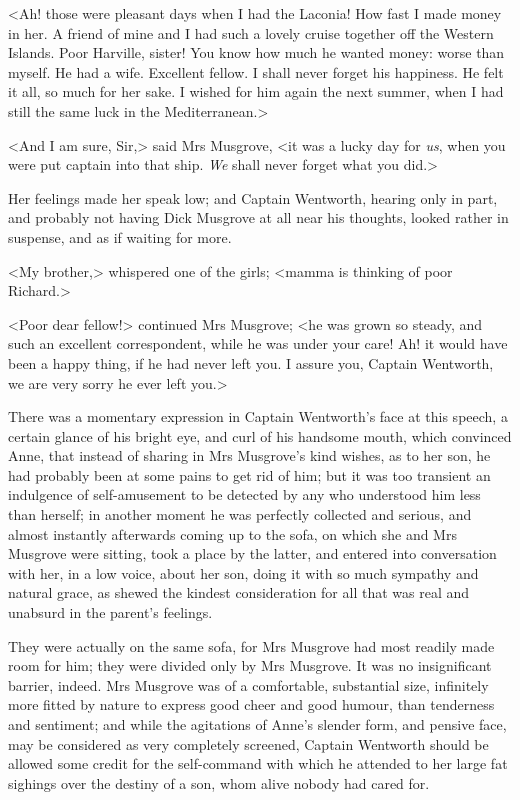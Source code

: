 <Ah! those were pleasant days when I had the Laconia! How fast I made money in her. A friend of mine and I had such a lovely cruise together off the Western Islands. Poor Harville, sister! You know how much he wanted money: worse than myself. He had a wife. Excellent fellow. I shall never forget his happiness. He felt it all, so much for her sake. I wished for him again the next summer, when I had still the same luck in the Mediterranean.>

<And I am sure, Sir,> said Mrs Musgrove, <it was a lucky day for \textit{us}, when you were put captain into that ship. \textit{We} shall never forget what you did.>

Her feelings made her speak low; and Captain Wentworth, hearing only in part, and probably not having Dick Musgrove at all near his thoughts, looked rather in suspense, and as if waiting for more.

<My brother,> whispered one of the girls; <mamma is thinking of poor Richard.>

<Poor dear fellow!> continued Mrs Musgrove; <he was grown so steady, and such an excellent correspondent, while he was under your care! Ah! it would have been a happy thing, if he had never left you. I assure you, Captain Wentworth, we are very sorry he ever left you.>

There was a momentary expression in Captain Wentworth's face at this speech, a certain glance of his bright eye, and curl of his handsome mouth, which convinced Anne, that instead of sharing in Mrs Musgrove's kind wishes, as to her son, he had probably been at some pains to get rid of him; but it was too transient an indulgence of self-amusement to be detected by any who understood him less than herself; in another moment he was perfectly collected and serious, and almost instantly afterwards coming up to the sofa, on which she and Mrs Musgrove were sitting, took a place by the latter, and entered into conversation with her, in a low voice, about her son, doing it with so much sympathy and natural grace, as shewed the kindest consideration for all that was real and unabsurd in the parent's feelings.

They were actually on the same sofa, for Mrs Musgrove had most readily made room for him; they were divided only by Mrs Musgrove. It was no insignificant barrier, indeed. Mrs Musgrove was of a comfortable, substantial size, infinitely more fitted by nature to express good cheer and good humour, than tenderness and sentiment; and while the agitations of Anne's slender form, and pensive face, may be considered as very completely screened, Captain Wentworth should be allowed some credit for the self-command with which he attended to her large fat sighings over the destiny of a son, whom alive nobody had cared for.

